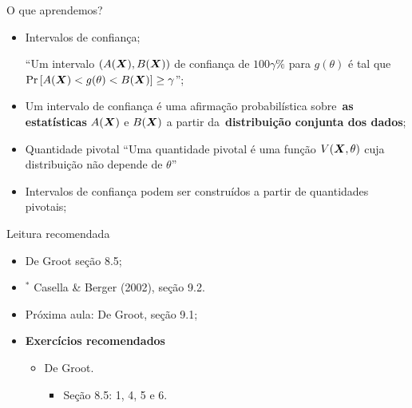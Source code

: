 \begin{frame}{O que aprendemos?}
\begin{itemize}

  \item[\faLightbulbO] Intervalos de confiança;    
  
   ``Um intervalo $(A(\boldsymbol{X}), B(\boldsymbol{X}))$  de confiança de $100\gamma\%$ para $g(\theta)$ é tal que $\operatorname{Pr}\left[ A(\boldsymbol{X}) < g(\theta) <  B(\boldsymbol{X}) \right] \geq \gamma$'';
   
  \item[\faLightbulbO] Um intervalo de confiança é uma afirmação probabilística sobre~\textbf{as estatísticas} $A(\boldsymbol{X})$ e $B(\boldsymbol{X})$ a partir da~\textbf{distribuição conjunta dos dados};
  
  \item[\faLightbulbO] Quantidade pivotal
  ``Uma quantidade pivotal é uma função $V(\boldsymbol{X}, \theta)$ cuja distribuição não depende de $\theta$''
     
   \item[\faLightbulbO] Intervalos de confiança podem ser construídos a partir de quantidades pivotais;  
  
  \end{itemize}
 \end{frame}

\begin{frame}{Leitura recomendada}
\begin{itemize}
 \item[\faBook] De Groot seção 8.5;
 \item[\faBook] $^\ast$ Casella \& Berger (2002), seção 9.2.
 \item[\faForward] Próxima aula: De Groot, seção 9.1;
 \item {\large\textbf{Exercícios recomendados}}
 \begin{itemize}
  \item[\faBookmark] De Groot.
  \begin{itemize}
   \item Seção 8.5: 1, 4, 5 e 6.
  \end{itemize}   
  \end{itemize}
 \end{itemize} 
\end{frame}
